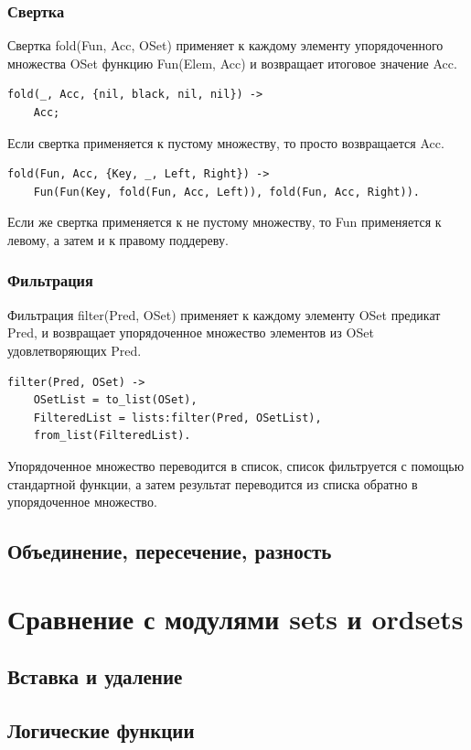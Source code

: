 		\subsubsection{Свертка}
			Свертка fold(Fun, Acc, OSet) применяет к каждому элементу упорядоченного
			множества OSet функцию Fun(Elem, Acc) и возвращает итоговое значение Acc.
			\begin{lstlisting}
fold(_, Acc, {nil, black, nil, nil}) ->
	Acc;	
			\end{lstlisting}
			Если свертка применяется к пустому множеству, то просто возвращается Acc.
			\begin{lstlisting}
fold(Fun, Acc, {Key, _, Left, Right}) ->
	Fun(Fun(Key, fold(Fun, Acc, Left)), fold(Fun, Acc, Right)).
			\end{lstlisting}
			Если же свертка применяется к не пустому множеству, то Fun применяется к левому, 
			а затем и к правому поддереву.
		
		\subsubsection{Фильтрация}
			Фильтрация filter(Pred, OSet) применяет к каждому элементу OSet предикат Pred, и 
			возвращает упорядоченное множество элементов из OSet удовлетворяющих Pred.
			\begin{lstlisting}
filter(Pred, OSet) ->
	OSetList = to_list(OSet),
	FilteredList = lists:filter(Pred, OSetList),
	from_list(FilteredList).	
			\end{lstlisting}
			Упорядоченное множество переводится в список, список фильтруется с помощью стандартной 
			функции, а затем результат переводится из списка обратно в упорядоченное множество.
			
			
	\subsection{Объединение, пересечение, разность}


\section{Сравнение с модулями sets и ordsets}
	\subsection{Вставка и удаление}
	\subsection{Логические функции}
